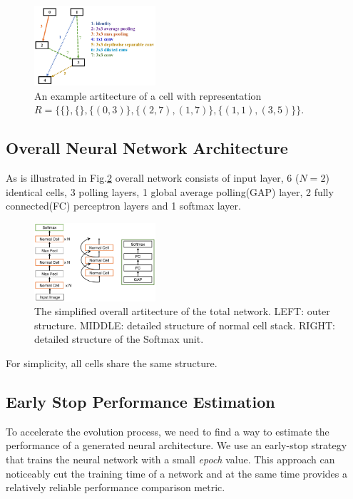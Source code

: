 \documentclass[conference]{IEEEtran}
\begin{document}
  \begin{figure}[H]
     \centering
     \includegraphics[width=0.4\textwidth]{figures/cellStruct.png}
   \caption{An example artitecture of a cell with representation $R=\{\{\},\{\},\{(0,3)\},\{(2,7),(1,7)\},\{(1,1),(3,5)\}\}$.}\label{fig:digit}
   \label{f_artc}
  \end{figure}

  \subsection{Overall Neural Network Architecture}
  As is illustrated in Fig.\ref{total_artc} overall network consists of input layer, 6 ($N = 2$) identical cells, 3 polling layers, 1 global average polling(GAP) layer, 2 fully connected(FC) perceptron layers and 1 softmax layer. 

  \begin{figure}[H]
     \centering
     \includegraphics[width=0.4\textwidth]{figures/overallStruct.png}
   \caption{The simplified overall artitecture of the total network. LEFT: outer structure. MIDDLE: detailed structure of normal cell stack. RIGHT: detailed structure of the Softmax unit.}\label{fig:digit}
   \label{total_artc}
  \end{figure}

  For simplicity, all cells share the same structure. 

  \subsection{Early Stop Performance Estimation}

  To accelerate the evolution process, we need to find a way to estimate the performance of a generated neural architecture. We use an early-stop strategy that trains the neural network with a small \emph{epoch} value. This approach can noticeably cut the training time of a network and at the same time provides a relatively reliable performance comparison metric.
\end{document}
